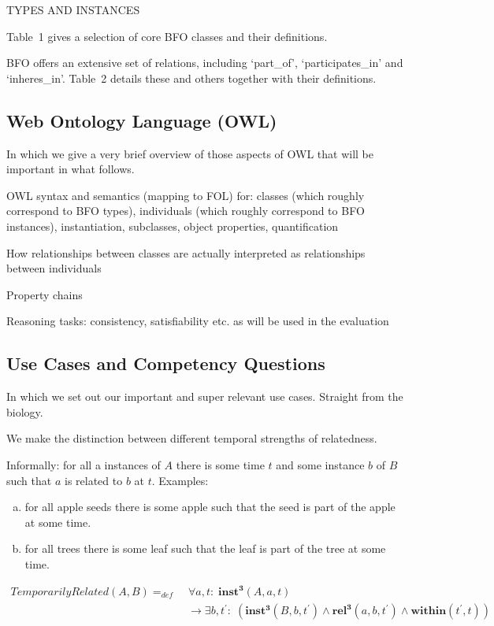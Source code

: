 \documentclass[10pt]{bmc_article}
\newcommand{\mirel}[1]{\ensuremath{\mathrm{\mathbf{#1}}}}
\newcommand{\mclass}[1]{\ensuremath{\mathit{#1}}}
\newcommand{\mrel}[2]{\mirel{#1^#2}}
\newcommand{\mrelt}[1]{\mrel{#1}{3}}
\newenvironment{bmcformat}{\baselineskip20pt\sloppy\setboolean{publ}{false}}{\baselineskip20pt\sloppy}
\begin{document}
\begin{bmcformat}
TYPES AND INSTANCES

Table~1 gives a selection of core BFO classes and their definitions.

BFO offers an extensive set of relations, including `part\_of', `participates\_in' and `inheres\_in'. 
Table~2 details these and others together with their definitions.

\subsection*{Web Ontology Language (OWL)}

In which we give a very brief overview of those aspects of OWL that will be important in what follows.

OWL syntax and semantics (mapping to FOL) for: classes (which roughly correspond to BFO types), individuals (which roughly correspond to BFO instances), instantiation, subclasses, object properties, quantification

How relationships between classes are actually interpreted as relationships between individuals

Property chains

Reasoning tasks: consistency, satisfiability etc. as will be used in the evaluation


\subsection*{Use Cases and Competency Questions}

In which we set out our important and super relevant use cases. Straight from the biology. 

We make the distinction between different temporal strengths of relatedness. 


Informally: for all a instances of \mclass{A} there is some time $t$ and some instance $b$ of
\mclass{B} such that $a$ is related to $b$ at $t$. Examples: 
\begin{enumerate}[(a)]
\item for all apple seeds there is
some apple such that the seed is part of the apple at some time. 
\item for all
trees there is some leaf such that the leaf is part of the tree at some time.
\end{enumerate}

\begin{equation}
\begin{split}
\mclass{TemporarilyRelated}(\mclass{A},\mclass{B}) =_{def}&\;
\forall a, t:\; \mrelt{inst}(\mclass{A}, a, t) \\
&\ \rightarrow
\exists b, t^\prime:\;(\mrelt{inst}(\mclass{B},b,t^\prime) \wedge
\mrelt{rel}(a,b,t^\prime) \wedge \mirel{within}(t^\prime,t))
\end{split}
\label{eq:temporarily}
\end{equation}


\end{bmcformat}
\end{document}
